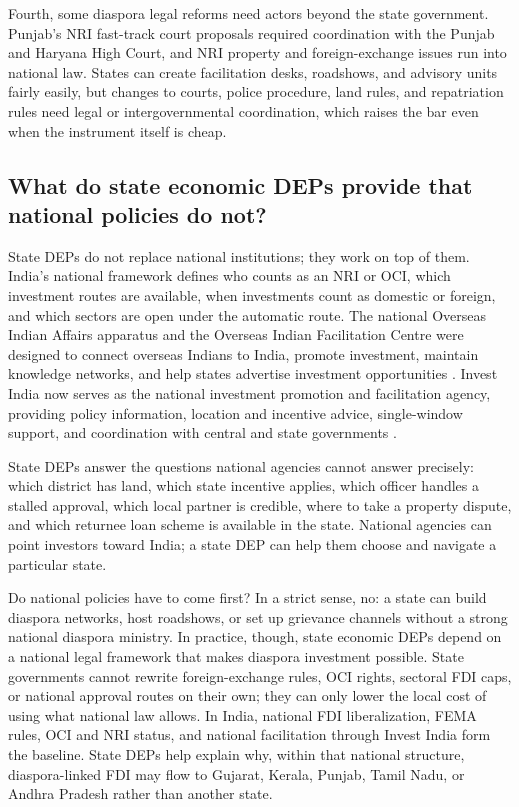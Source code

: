 \documentclass[12pt]{article}
\let\oldsubsection\subsection
\renewcommand{\subsection}{\FloatBarrier\oldsubsection}
\begin{document}
Fourth, some diaspora legal reforms need actors beyond the state government. Punjab's NRI fast-track court proposals required coordination with the Punjab and Haryana High Court, and NRI property and foreign-exchange issues run into national law. States can create facilitation desks, roadshows, and advisory units fairly easily, but changes to courts, police procedure, land rules, and repatriation rules need legal or intergovernmental coordination, which raises the bar even when the instrument itself is cheap.

\subsection{What do state economic DEPs provide that national policies do not?}

State DEPs do not replace national institutions; they work on top of them. India's national framework defines who counts as an NRI or OCI, which investment routes are available, when investments count as domestic or foreign, and which sectors are open under the automatic route. The national Overseas Indian Affairs apparatus and the Overseas Indian Facilitation Centre were designed to connect overseas Indians to India, promote investment, maintain knowledge networks, and help states advertise investment opportunities \citep{ministry_of_external_affairs_overview_nodate, high_commission_of_india_dar_es_salaam_high_nodate}. Invest India now serves as the national investment promotion and facilitation agency, providing policy information, location and incentive advice, single-window support, and coordination with central and state governments \citep{maximize_india_with_maximum_world_about_nodate}.

State DEPs answer the questions national agencies cannot answer precisely: which district has land, which state incentive applies, which officer handles a stalled approval, which local partner is credible, where to take a property dispute, and which returnee loan scheme is available in the state. National agencies can point investors toward India; a state DEP can help them choose and navigate a particular state.

Do national policies have to come first? In a strict sense, no: a state can build diaspora networks, host roadshows, or set up grievance channels without a strong national diaspora ministry. In practice, though, state economic DEPs depend on a national legal framework that makes diaspora investment possible. State governments cannot rewrite foreign-exchange rules, OCI rights, sectoral FDI caps, or national approval routes on their own; they can only lower the local cost of using what national law allows. In India, national FDI liberalization, FEMA rules, OCI and NRI status, and national facilitation through Invest India form the baseline. State DEPs help explain why, within that national structure, diaspora-linked FDI may flow to Gujarat, Kerala, Punjab, Tamil Nadu, or Andhra Pradesh rather than another state.
\end{document}
